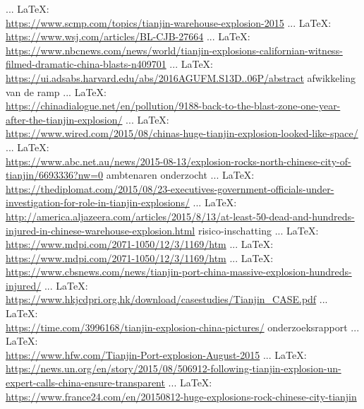 \begin{thebibliography}{99}
 ... \LaTeX:\\ \url{https://www.scmp.com/topics/tianjin-warehouse-explosion-2015}
 ... \LaTeX:\\ \url{https://www.wsj.com/articles/BL-CJB-27664}
 ... \LaTeX:\\ \url{https://www.nbcnews.com/news/world/tianjin-explosions-californian-witness-filmed-dramatic-china-blasts-n409701}
 ... \LaTeX:\\ \url{https://ui.adsabs.harvard.edu/abs/2016AGUFM.S13D..06P/abstract}
afwikkeling van de ramp
 ... \LaTeX:\\ \url{https://chinadialogue.net/en/pollution/9188-back-to-the-blast-zone-one-year-after-the-tianjin-explosion/}
 ... \LaTeX:\\ \url{https://www.wired.com/2015/08/chinas-huge-tianjin-explosion-looked-like-space/}
 ... \LaTeX:\\ \url{https://www.abc.net.au/news/2015-08-13/explosion-rocks-north-chinese-city-of-tianjin/6693336?nw=0}
ambtenaren onderzocht
 ... \LaTeX:\\ \url{https://thediplomat.com/2015/08/23-executives-government-officials-under-investigation-for-role-in-tianjin-explosions/}
 ... \LaTeX:\\ \url{http://america.aljazeera.com/articles/2015/8/13/at-least-50-dead-and-hundreds-injured-in-chinese-warehouse-explosion.html}
risico-inschatting
 ... \LaTeX:\\ \url{https://www.mdpi.com/2071-1050/12/3/1169/htm}
 ... \LaTeX:\\ \url{https://www.mdpi.com/2071-1050/12/3/1169/htm}
 ... \LaTeX:\\ \url{https://www.cbsnews.com/news/tianjin-port-china-massive-explosion-hundreds-injured/}
 ... \LaTeX:\\ \url{https://www.hkjcdpri.org.hk/download/casestudies/Tianjin_CASE.pdf}
 ... \LaTeX:\\ \url{https://time.com/3996168/tianjin-explosion-china-pictures/}
onderzoeksrapport
 ... \LaTeX:\\ \url{https://www.hfw.com/Tianjin-Port-explosion-August-2015}
 ... \LaTeX:\\ \url{https://news.un.org/en/story/2015/08/506912-following-tianjin-explosion-un-expert-calls-china-ensure-transparent}
 ... \LaTeX:\\ \url{https://www.france24.com/en/20150812-huge-explosions-rock-chinese-city-tianjin}

\end{thebibliography}
